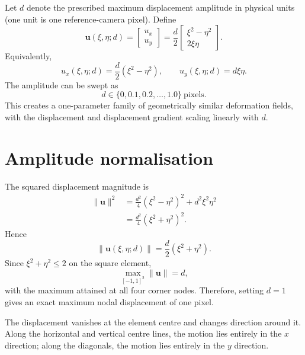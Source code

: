 \documentclass[11pt,a4paper]{article}
\newcommand{\vect}[1]{\bm{#1}}
\begin{document}
Let $d$ denote the prescribed maximum displacement amplitude in physical units
(one unit is one reference-camera pixel). Define
\begin{equation}
  \boxed{
  \vect{u}(\xi,\eta;d)
  =
  \begin{bmatrix}
    u_x\\[2pt]
    u_y
  \end{bmatrix}
  =
  \frac{d}{2}
  \begin{bmatrix}
    \xi^2-\eta^2\\[2pt]
    2\xi\eta
  \end{bmatrix}.}
  \label{eq:saddle}
\end{equation}
Equivalently,
\begin{equation}
  u_x(\xi,\eta;d)=\frac{d}{2}(\xi^2-\eta^2),
  \qquad
  u_y(\xi,\eta;d)=d\xi\eta.
\end{equation}
The amplitude can be swept as
\begin{equation}
  d\in\{0,0.1,0.2,\ldots,1.0\}\ \text{pixels}.
\end{equation}
This creates a one-parameter family of geometrically similar deformation fields, with the displacement and displacement gradient scaling linearly with $d$.

\section{Amplitude normalisation}

The squared displacement magnitude is
\begin{align}
  \|\vect{u}\|^2
  &=\frac{d^2}{4}(\xi^2-\eta^2)^2+d^2\xi^2\eta^2\\
  &=\frac{d^2}{4}(\xi^2+\eta^2)^2.
\end{align}
Hence
\begin{equation}
  \boxed{\|\vect{u}(\xi,\eta;d)\|
  =\frac{d}{2}(\xi^2+\eta^2).}
\end{equation}
Since $\xi^2+\eta^2\le2$ on the square element,
\begin{equation}
  \max_{[-1,1]^2}\|\vect{u}\|=d,
\end{equation}
with the maximum attained at all four corner nodes. Therefore, setting $d=1$ gives an exact maximum nodal displacement of one pixel.

The displacement vanishes at the element centre and changes direction around it. Along the horizontal and vertical centre lines, the motion lies entirely in the $x$ direction; along the diagonals, the motion lies entirely in the $y$ direction.
\end{document}
